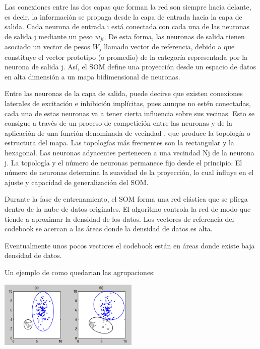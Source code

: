 Las conexiones entre las dos capas que forman la red son siempre hacia delante, es decir, la información se propaga desde la capa de entrada hacia la capa de salida. Cada neurona de entrada i está conectada con cada una de las neuronas de salida j mediante un peso $w_{ji}$. De esta forma, las neuronas de salida tienen asociado un vector de pesos $W_j$ llamado vector de referencia, debido a que constituye el vector prototipo (o promedio) de la categoría representada por la neurona de salida j. Así, el SOM define una proyección desde un espacio de datos en alta dimensión a un mapa bidimensional de neuronas.

Entre las neuronas de la capa de salida, puede decirse que existen conexiones laterales de excitación e inhibición implícitas, pues aunque no estén conectadas, cada una de estas neuronas va a tener cierta influencia sobre sus vecinas. Esto se consigue a través de un proceso de competición entre las neuronas y de la aplicación de una función denominada de vecindad , que produce la topología o estructura del mapa. Las topologías más frecuentes son la rectangular y la hexagonal.
Las neuronas adyacentes pertenecen a una vecindad Nj de la neurona j. La topología y el número de neuronas permanece fijo desde el principio. El número de neuronas determina la suavidad de la proyección, lo cual influye en el ajuste y capacidad de generalización del SOM.	

Durante la fase de entrenamiento, el SOM forma una red elástica que se pliega dentro de la nube de datos originales. El algoritmo controla la red de modo que tiende a aproximar la densidad de los datos. Los vectores de referencia del codebook se acercan a las áreas donde la densidad de datos es alta. 

Eventualmente unos pocos vectores el codebook están en áreas donde existe baja densidad de datos.

Un ejemplo de como quedarian las agrupaciones: 

\begin{center}
\includegraphics[width=0.5\textwidth]{img/agrupaciones1}
\end{center}